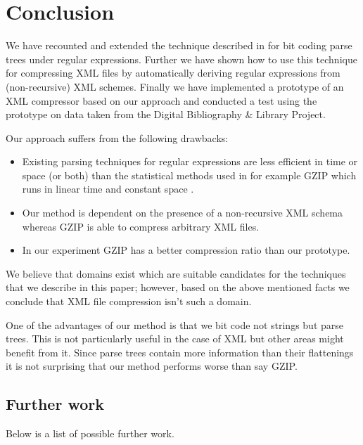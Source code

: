\documentclass[a4paper, oneside]{memoir}
\theoremstyle{definition}
\begin{document}
% 

\chapter{Conclusion}
\label{chap:conclusion}

We have recounted and extended the technique described in \cite{heni2010} for
bit coding parse trees under regular expressions. Further we have shown how to
use this technique for compressing XML files by automatically deriving regular
expressions from (non-recursive) XML schemes. Finally we have implemented a
prototype of an XML compressor based on our approach and conducted a test using
the prototype on data taken from the Digital Bibliography \& Library Project.

Our approach suffers from the following drawbacks:

\begin{itemize}
\item Existing parsing techniques for regular expressions are less efficient in
  time or space (or both) than the statistical methods used in for example GZIP
  which runs in linear time and constant space \cite{de1996}.
\item Our method is dependent on the presence of a non-recursive XML schema
  whereas GZIP is able to compress arbitrary XML files.
\item In our experiment GZIP has a better compression ratio than our prototype.
\end{itemize}

We believe that domains exist which are suitable candidates for the techniques
that we describe in this paper; however, based on the above mentioned facts we
conclude that XML file compression isn't such a domain.

One of the advantages of our method is that we bit code not strings but parse
trees. This is not particularly useful in the case of XML but other areas might
benefit from it. Since parse trees contain more information than their
flattenings it is not surprising that our method performs worse than say GZIP.

\section{Further work}

Below is a list of possible further work.
\end{document}
